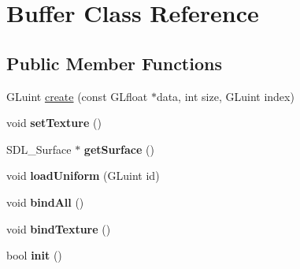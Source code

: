 \hypertarget{classBuffer}{}\section{Buffer Class Reference}
\label{classBuffer}
\subsection*{Public Member Functions}
\begin{DoxyCompactItemize}
\item 
G\+Luint \mbox{\hyperlink{classBuffer_a6fc374a8a64e465f1d89a0231db21387}{create}} (const G\+Lfloat $\ast$data, int size, G\+Luint index)
\item 
\mbox{\label{classBuffer_a3b074802b68b04b8ff37a2c4a9c67ca9}} 
void {\bfseries set\+Texture} ()
\item 
\mbox{\label{classBuffer_aeb7dd5ef127e52c37fe9a648c6940f4f}} 
S\+D\+L\+\_\+\+Surface $\ast$ {\bfseries get\+Surface} ()
\item 
\mbox{\label{classBuffer_acbc589928fb84ba8c0262e6d7436186f}} 
void {\bfseries load\+Uniform} (G\+Luint id)
\item 
\mbox{\label{classBuffer_ac12acf3f8cc4f59c3d8d6fc32d5cd262}} 
void {\bfseries bind\+All} ()
\item 
\mbox{\label{classBuffer_a53166024aee649e00b0908cc04d2ccaa}} 
void {\bfseries bind\+Texture} ()
\item 
\mbox{\label{classBuffer_a9e8de833e80d867879b0fcb9c6ee9aa6}} 
bool {\bfseries init} ()
\end{DoxyCompactItemize}
